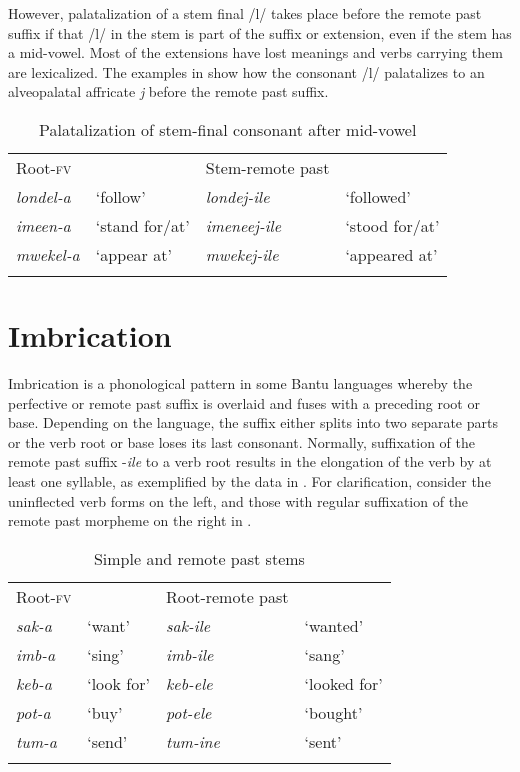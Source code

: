 \documentclass[output=paper]{langsci/langscibook}
\begin{document}
However, palatalization of a stem final /l/ takes place before the remote past suffix if that /l/ in the stem is part of the suffix or extension, even if the stem has a mid-vowel. Most of the extensions have lost meanings and verbs carrying them are lexicalized. The examples in  show how the consonant /l/ palatalizes to an alveopalatal affricate \textit{j} before the remote past suffix.

\begin{table}
\begin{tabular}{llll}
\lsptoprule
Root-\textsc{fv} &  & Stem-remote past & \\
\textit{londel-a} & `follow' & \textit{londej-ile} & `followed' \\
\textit{imeen-a} & `stand for/at' & \textit{imeneej-ile} & `stood for/at' \\
\textit{mwekel-a} & `appear at' & \textit{mwekej-ile} & `appeared at' \\

\lspbottomrule
\end{tabular}

\caption{Palatalization of stem-final consonant after mid-vowel}
\label{tab:17.kawasha}

\end{table}


\section{Imbrication} \label{§4:imbrication.kawasha}

Imbrication is a phonological pattern in some Bantu languages whereby the perfective or remote past suffix is overlaid and fuses with a preceding root or base. Depending on the language, the suffix either splits into two separate parts or the verb root or base loses its last consonant. Normally, suffixation of the remote past suffix -\textit{ile} to a verb root results in the elongation of the verb by at least one syllable, as exemplified by the data in . For clarification, consider the uninflected verb forms on the left, and those with regular suffixation of the remote past morpheme on the right in . 

\begin{table}
\begin{tabular}{llll}
\lsptoprule
Root-\textsc{fv} &  & Root-remote past & \\
\textit{sak-a} & `want' & \textit{sak-ile} & `wanted' \\
\textit{imb-a} & `sing' & \textit{imb-ile} & `sang' \\
\textit{keb-a} & `look for' & \textit{keb-ele} & `looked for' \\
\textit{pot-a} & `buy' & \textit{pot-ele} & `bought' \\
\textit{tum-a} & `send' & \textit{tum-ine} & `sent' \\

\lspbottomrule
\end{tabular}

\caption{Simple and remote past stems}
\label{tab:18.kawasha}

\end{table}
\end{document}
